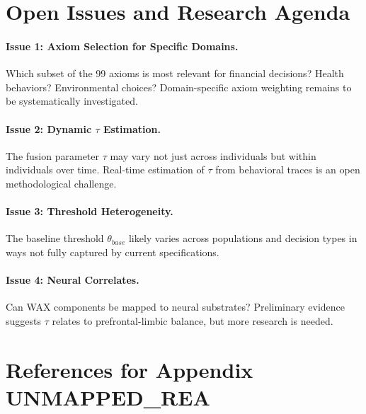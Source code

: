 
\section{Open Issues and Research Agenda}
\label{sec:av-openissues}

\paragraph{Issue 1: Axiom Selection for Specific Domains.}
Which subset of the 99 axioms is most relevant for financial decisions?
Health behaviors? Environmental choices? Domain-specific axiom weighting
remains to be systematically investigated.

\paragraph{Issue 2: Dynamic $\tau$ Estimation.}
The fusion parameter $\tau$ may vary not just across individuals but
within individuals over time. Real-time estimation of $\tau$ from
behavioral traces is an open methodological challenge.

\paragraph{Issue 3: Threshold Heterogeneity.}
The baseline threshold $\theta_{base}$ likely varies across populations
and decision types in ways not fully captured by current specifications.

\paragraph{Issue 4: Neural Correlates.}
Can WAX components be mapped to neural substrates? Preliminary evidence
suggests $\tau$ relates to prefrontal-limbic balance, but more research
is needed.


\section{References for Appendix UNMAPPED_REA}
\label{sec:av-references}

